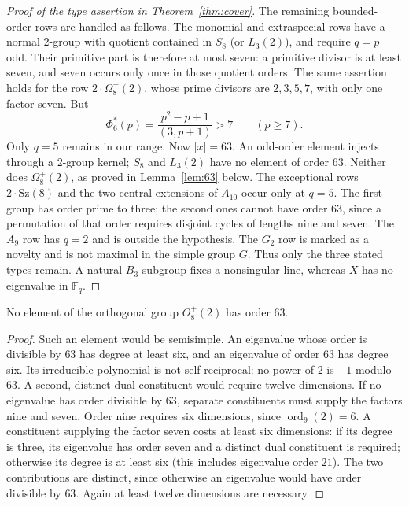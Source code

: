 \documentclass[11pt]{article}
\newcommand{\F}{\mathbb F}\newcommand{\Om}{\Omega}\newcommand{\PGU}{\operatorname{PGU}}\newcommand{\GL}{\operatorname{GL}}\newcommand{\End}{\operatorname{End}}\newcommand{\PSU}{\operatorname{PSU}}
\begin{document}
\begin{proof}[Proof of the type assertion in Theorem~\ref{thm:cover}]
The remaining bounded-order rows are handled as follows. The monomial and
extraspecial rows have a normal $2$-group with quotient contained in $S_8$
(or $L_3(2)$), and require $q=p$ odd. Their primitive part is therefore at
most seven: a primitive divisor is at least seven, and seven occurs only
once in those quotient orders. The same assertion holds for the row
$2\cdot\Om_8^+(2)$, whose prime divisors are $2,3,5,7$, with only one
factor seven. But
\[
 \Phi_6^*(p)=\frac{p^2-p+1}{(3,p+1)}>7\qquad(p\ge7).
\]
Only $q=5$ remains in our range. Now $|x|=63$. An odd-order element
injects through a $2$-group kernel; $S_8$ and $L_3(2)$ have no element of
order $63$. Neither does $\Om_8^+(2)$, as proved in
Lemma~\ref{lem:63} below. The exceptional rows $2\cdot\mathrm{Sz}(8)$
and the two central extensions of $A_{10}$ occur only at $q=5$.
The first group has order prime to three; the second ones cannot have
order $63$, since a permutation of that order requires disjoint cycles
of lengths nine and seven. The $A_9$ row has $q=2$ and is outside the
hypothesis. The $G_2$ row is marked as a novelty and is not maximal
in the simple group $G$.
Thus only the three stated types remain. A natural $B_3$ subgroup fixes
a nonsingular line, whereas $X$ has no eigenvalue in $\F_q$.
\end{proof}

\begin{lemma}\label{lem:63}
No element of the orthogonal group $O_8^+(2)$ has order $63$.
\end{lemma}
\begin{proof}
Such an element would be semisimple. An eigenvalue whose order is divisible
by $63$ has degree at least six, and an eigenvalue of order $63$ has degree
six. Its irreducible polynomial is not self-reciprocal: no power of $2$
is $-1$ modulo $63$. A second, distinct dual constituent would require
twelve dimensions. If no eigenvalue has order divisible by $63$, separate
constituents must supply the factors nine and seven. Order nine requires
six dimensions, since $\operatorname{ord}_9(2)=6$. A constituent supplying
the factor seven costs at least six dimensions: if its degree is three,
its eigenvalue has order seven and a distinct dual constituent is required;
otherwise its degree is at least six (this includes eigenvalue order $21$).
The two contributions are distinct, since otherwise an eigenvalue would
have order divisible by $63$. Again at least twelve dimensions are necessary.
\end{proof}
\end{document}
